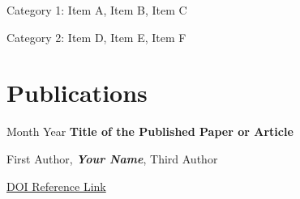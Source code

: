 \begin{onecolentry}
    \begin{highlights}
        \item Category 1: Item A, Item B, Item C
        \item Category 2: Item D, Item E, Item F
    \end{highlights}
\end{onecolentry}


\section{Publications}

\begin{samepage}
    \begin{twocolentry}{
        Month Year
    }
        \textbf{Title of the Published Paper or Article}
    \end{twocolentry}
    \vspace{0.10 cm}
    \begin{onecolentry}
        First Author, \textbf{\textit{Your Name}}, Third Author
        \vspace{0.10 cm}
        
        \href{https://doi.org/10.1109/XXXX.XXXXXXX}{DOI Reference Link}
    \end{onecolentry}
\end{samepage}
